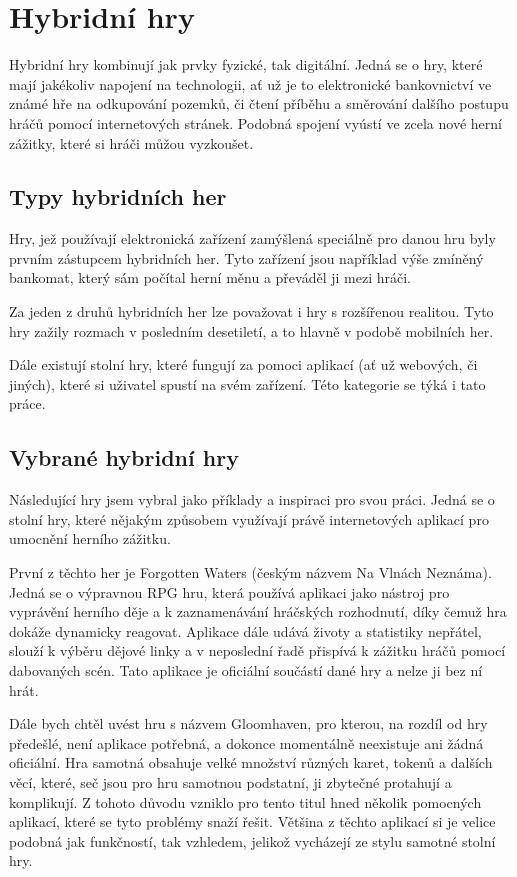 \chapter{Hybridní hry}
Hybridní hry kombinují jak prvky fyzické, tak digitální. Jedná se o hry, které mají jakékoliv napojení na technologii, ať už je to elektronické bankovnictví ve známé hře na odkupování pozemků, či čtení příběhu a směrování dalšího postupu hráčů pomocí internetových stránek. Podobná spojení vyústí ve zcela nové herní zážitky, které si hráči můžou vyzkoušet.

\section{Typy hybridních her}
Hry, jež používají elektronická zařízení zamýšlená speciálně pro danou hru byly prvním zástupcem hybridních her. Tyto zařízení jsou například výše zmíněný bankomat, který sám počítal herní měnu a převáděl ji mezi hráči.

Za jeden z druhů hybridních her lze považovat i hry s rozšířenou realitou. Tyto hry zažily rozmach v posledním desetiletí, a to hlavně v podobě mobilních her.

Dále existují stolní hry, které fungují za pomoci aplikací (ať už webových, či jiných), které si uživatel spustí na svém zařízení. Této kategorie se týká i tato práce.

\section{Vybrané hybridní hry}
Následující hry jsem vybral jako příklady a inspiraci pro svou práci. Jedná se o stolní hry, které nějakým způsobem využívají právě internetových aplikací pro umocnění herního zážitku.

První z těchto her je Forgotten Waters (českým názvem Na Vlnách Neznáma). Jedná se o výpravnou RPG hru, která používá aplikaci jako nástroj pro vyprávění herního děje a k zaznamenávání hráčských rozhodnutí, díky čemuž hra dokáže dynamicky reagovat. Aplikace dále udává životy a statistiky nepřátel, slouží k výběru dějové linky a v neposlední řadě přispívá k zážitku hráčů pomocí dabovaných scén. Tato aplikace je oficiální součástí dané hry a nelze ji bez ní hrát.

Dále bych chtěl uvést hru s názvem Gloomhaven, pro kterou, na rozdíl od hry předešlé, není aplikace potřebná, a dokonce momentálně neexistuje ani žádná oficiální. Hra samotná obsahuje velké množství různých karet, tokenů a dalších věcí, které, seč jsou pro hru samotnou podstatní, ji zbytečné protahují a komplikují. Z tohoto důvodu vzniklo pro tento titul hned několik pomocných aplikací, které se tyto problémy snaží řešit. Většina z těchto aplikací si je velice podobná jak funkčností, tak vzhledem, jelikož vycházejí ze stylu samotné stolní hry.